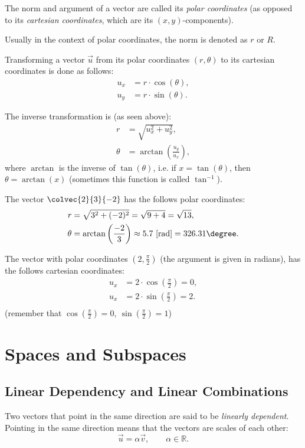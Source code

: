 The norm and argument of a vector are called its \emph{polar coordinates} (as opposed to its \emph{cartesian coordinates}, which are its $\left( x,y \right)$-components).

Usually in the context of polar coordinates, the norm is denoted as $r$ or $R$.

Transforming a vector $\vec{u}$ from its polar coordinates $\left( r, \theta \right)$ to its cartesian coordinates is done as follows:
\begin{align*}
  u_{x} &= r \cdot \cos(\theta),\\
  u_{y} &= r \cdot \sin(\theta).
\end{align*}

The inverse transformation is (as seen above):
\begin{align*}
  r &= \sqrt{u_{x}^{2} + u_{y}^{2}},\\
  \theta &= \arctan\left( \frac{u_{y}}{u_{x}} \right),
\end{align*}
where $\arctan$ is the inverse of $\tan(\theta)$, i.e. if $x=\tan(\theta)$, then $\theta=\arctan(x)$ (sometimes this function is called $\tan^{-1}$).

\begin{example}
  
  The vector $\colvec{2}{3}{-2}$ has the follows polar coordinates:
  \begin{align*}
  r &= \sqrt{3^{2}+(-2)^{2}} = \sqrt{9+4} = \sqrt{13},\\
  \theta &= \arctan\left( \frac{-2}{3} \right) \approx 5.7\ \text{[rad]} = 326.31\degree.
  \end{align*}

  The vector with polar coordinates $\left( 2, \frac{\pi}{2} \right)$ (the argument is given in radians), has the follows cartesian coordinates:
  \begin{align*}
  u_{x} &= 2\cdot\cos\left(\frac{\pi}{2}\right) = 0,\\
  u_{x} &= 2\cdot\sin\left(\frac{\pi}{2}\right) = 2.\\
  \end{align*}
  (remember that $\cos\left( \frac{\pi}{2} \right) = 0,\ \sin\left( \frac{\pi}{2} \right)=1$)
\end{example}

\section{Spaces and Subspaces}
\subsection{Linear Dependency and Linear Combinations}
Two vectors that point in the same direction are said to be \emph{linearly dependent}. Pointing in the same direction means that the vectors are scales of each other:
\begin{equation*}
   \vec{u} = \alpha\vec{v},\qquad\alpha\in\mathbb{R}.
\end{equation*}

